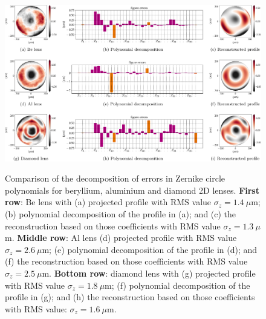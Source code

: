 \begin{refsection}
\begin{figure}[t]
        \centering
        {\includegraphics[width=1.\linewidth]{figures/ch04/metrology_zernike_profiles.pdf}}
        \caption[Other sources of deviations from the parabolic shape]{Comparison of the decomposition of errors in Zernike circle polynomials for beryllium, aluminium and diamond 2D lenses. \textbf{First row}: Be lens with (a) projected profile with RMS value $\sigma_z=1.4~\mu$m; (b) polynomial decomposition of the profile in (a); and (c) the reconstruction based on those coefficients with RMS value $\sigma_z=1.3~\mu$m. \textbf{Middle row}: Al lens (d) projected profile with RMS value $\sigma_z=2.6~\mu$m; (e) polynomial decomposition of the profile in (d); and (f) the reconstruction based on those coefficients with RMS value $\sigma_z=2.5~\mu$m. \textbf{Bottom row}: diamond lens with (g) projected profile with RMS value $\sigma_z=1.8~\mu$m; (f) polynomial decomposition of the profile in (g); and (h) the reconstruction based on those coefficients with RMS value: $\sigma_z=1.6~\mu$m.}
        \label{fig:metrology_zernike_profiles}
\end{figure}


\end{refsection}
